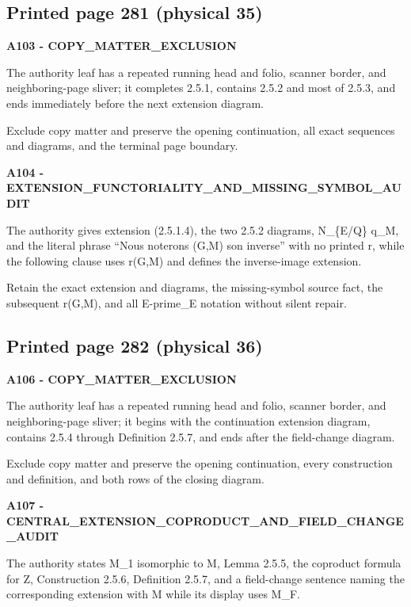 \documentclass[10pt,a4paper]{article}
\begin{document}
\subsection{Printed page 281 (physical 35)}

\textbf{A103 - COPY\_MATTER\_EXCLUSION}

The authority leaf has a repeated running head and folio, scanner border, and neighboring-page sliver; it completes 2.5.1, contains 2.5.2 and most of 2.5.3, and ends immediately before the next extension diagram.

Exclude copy matter and preserve the opening continuation, all exact sequences and diagrams, and the terminal page boundary.

\textbf{A104 - EXTENSION\_FUNCTORIALITY\_AND\_MISSING\_SYMBOL\_AUDIT}

The authority gives extension (2.5.1.4), the two 2.5.2 diagrams, N\_\{E/Q\} q\_M, and the literal phrase ``Nous noterons (G,M) son inverse'' with no printed r, while the following clause uses r(G,M) and defines the inverse-image extension.

Retain the exact extension and diagrams, the missing-symbol source fact, the subsequent r(G,M), and all E-prime\_E notation without silent repair.

\subsection{Printed page 282 (physical 36)}

\textbf{A106 - COPY\_MATTER\_EXCLUSION}

The authority leaf has a repeated running head and folio, scanner border, and neighboring-page sliver; it begins with the continuation extension diagram, contains 2.5.4 through Definition 2.5.7, and ends after the field-change diagram.

Exclude copy matter and preserve the opening continuation, every construction and definition, and both rows of the closing diagram.

\textbf{A107 - CENTRAL\_EXTENSION\_COPRODUCT\_AND\_FIELD\_CHANGE\_AUDIT}

The authority states M\_1 isomorphic to M, Lemma 2.5.5, the coproduct formula for Z, Construction 2.5.6, Definition 2.5.7, and a field-change sentence naming the corresponding extension with M while its display uses M\_F.
\end{document}
